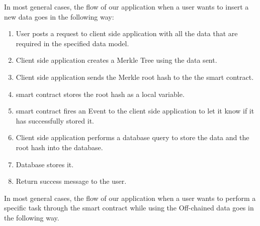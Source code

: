 In most general cases, the flow of our application when a user wants to insert a new data goes in the following way: 

\begin{enumerate}
\item User posts a request to client side application with all the data that are required in the specified data model. 
\item Client side application creates a Merkle Tree using the data sent.
\item Client side application sends the Merkle root hash to the the smart contract.
\item smart contract stores the root hash as a local variable.
\item smart contract fires an Event to the client side application to let it know if it has successfully stored it. 
\item Client side application performs a database query to store the data and the root hash into the database.
\item Database stores it.
\item Return success message to the user. 
\end{enumerate}

In most general cases, the flow of our application when a user wants to perform a specific task through the smart contract while using the Off-chained data goes in the following way. 

